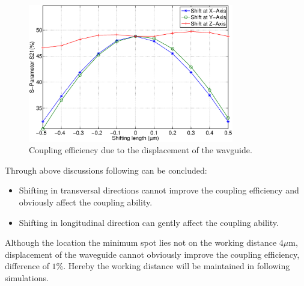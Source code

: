 \begin{figure}[!ht]
\centering
\includegraphics[width=0.8\textwidth]{bilder/shift_curve}
\caption{Coupling efficiency due to the displacement of the wavguide.}
\label{fig:shift_curve}
\end{figure}

Through above discussions following can be concluded:
\begin{itemize} 
\item Shifting in transversal directions cannot improve the coupling efficiency and obviously affect the coupling ability. 
\item Shifting in longitudinal direction can gently affect the coupling ability. 
\end{itemize}
Although the location the minimum spot lies not on the working distance $4\mu$m, displacement of the waveguide cannot obviously improve the coupling efficiency, difference of $1\%$. Hereby the working distance will be maintained in following simulations.\\
